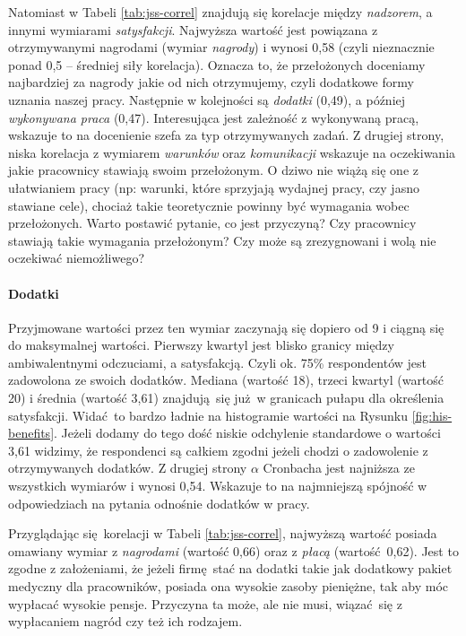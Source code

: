 Natomiast w Tabeli \ref{tab:jss-correl} znajdują się korelacje między \textit{nadzorem}, a innymi wymiarami \textit{satysfakcji}. Najwyższa wartość jest powiązana z otrzymywanymi nagrodami (wymiar \textit{nagrody}) i wynosi 0,58 (czyli nieznacznie ponad 0,5 -- średniej siły korelacja). Oznacza to, że przełożonych doceniamy najbardziej za nagrody jakie od nich otrzymujemy, czyli dodatkowe formy uznania naszej pracy. Następnie w kolejności są \textit{dodatki} (0,49), a
później \textit{wykonywana praca} (0,47). Interesująca jest zależność z wykonywaną pracą, wskazuje to na docenienie szefa za typ otrzymywanych zadań. Z drugiej strony, niska korelacja z wymiarem \textit{warunków} oraz \textit{komunikacji} wskazuje na oczekiwania jakie pracownicy stawiają swoim przełożonym. O dziwo nie wiążą się one z ułatwianiem pracy (np: warunki, które sprzyjają wydajnej pracy, czy jasno stawiane cele), chociaż takie teoretycznie powinny być
wymagania wobec przełożonych. Warto postawić pytanie, co jest przyczyną? Czy pracownicy stawiają takie wymagania przełożonym? Czy może są zrezygnowani i wolą nie oczekiwać niemożliwego?

\paragraph{Dodatki}\label{par:res-benefits} Przyjmowane wartości przez ten wymiar zaczynają się dopiero od 9 i ciągną się do maksymalnej wartości. Pierwszy kwartyl jest blisko granicy między ambiwalentnymi odczuciami, a satysfakcją. Czyli ok. 75\% respondentów jest zadowolona ze swoich dodatków. Mediana (wartość 18), trzeci kwartyl (wartość 20) i średnia (wartość 3,61) znajdują się już w granicach pułapu dla określenia satysfakcji. Widać to bardzo ładnie na histogramie wartości na
Rysunku \ref{fig:his-benefits}. Jeżeli dodamy do tego dość niskie
odchylenie standardowe o wartości 3,61 widzimy, że respondenci są całkiem zgodni jeżeli chodzi o zadowolenie z otrzymywanych dodatków. Z drugiej strony $\alpha$ Cronbacha jest najniższa ze wszystkich wymiarów i wynosi 0,54. Wskazuje to na najmniejszą spójność w odpowiedziach na pytania odnośnie dodatków w pracy.

Przyglądając się korelacji w Tabeli \ref{tab:jss-correl}, najwyższą wartość posiada omawiany wymiar z \textit{nagrodami} (wartość 0,66) oraz z \textit{płacą} (wartość 0,62). Jest to zgodne z założeniami, że jeżeli firmę stać na dodatki takie jak dodatkowy pakiet medyczny dla pracowników, posiada ona wysokie zasoby pieniężne, tak aby móc wypłacać wysokie pensje. Przyczyna ta może, ale nie musi, wiązać się z wypłacaniem nagród czy też ich rodzajem. 

